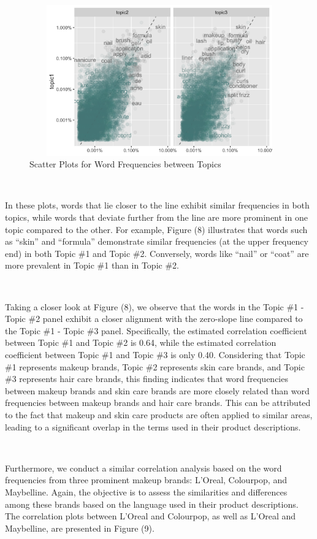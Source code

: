 \documentclass[10pt]{article}
\begin{document}
\begin{figure}[ht!]
    \centering
    \hspace*{-4em}
    \includegraphics[height=65mm, width=120mm]{corrplot1.png}
    \caption{Scatter Plots for Word Frequencies between Topics}
\end{figure}

\

In these plots, words that lie closer to the line exhibit similar frequencies in both topics, while words that deviate further from the line are more prominent in one topic compared to the other. For example, Figure (8) illustrates that words such as ``skin'' and ``formula'' demonstrate similar frequencies (at the upper frequency end) in both Topic \#1 and Topic \#2. Conversely, words like ``nail'' or ``coat'' are more prevalent in Topic \#1 than in Topic \#2.

\

Taking a closer look at Figure (8), we observe that the words in the Topic \#1 - Topic \#2 panel exhibit a closer alignment with the zero-slope line compared to the Topic \#1 - Topic \#3 panel. Specifically, the estimated correlation coefficient between Topic \#1 and Topic \#2 is 0.64, while the estimated correlation coefficient between Topic \#1 and Topic \#3 is only 0.40. Considering that Topic \#1 represents makeup brands, Topic \#2 represents skin care brands, and Topic \#3 represents hair care brands, this finding indicates that word frequencies between makeup brands and skin care brands are more closely related than word frequencies between makeup brands and hair care brands. This can be attributed to the fact that makeup and skin care products are often applied to similar areas, leading to a significant overlap in the terms used in their product descriptions.

\

Furthermore, we conduct a similar correlation analysis based on the word frequencies from three prominent makeup brands: L'Oreal, Colourpop, and Maybelline. Again, the objective is to assess the similarities and differences among these brands based on the language used in their product descriptions. The correlation plots between L'Oreal and Colourpop, as well as L'Oreal and Maybelline, are presented in Figure (9).
\end{document}
